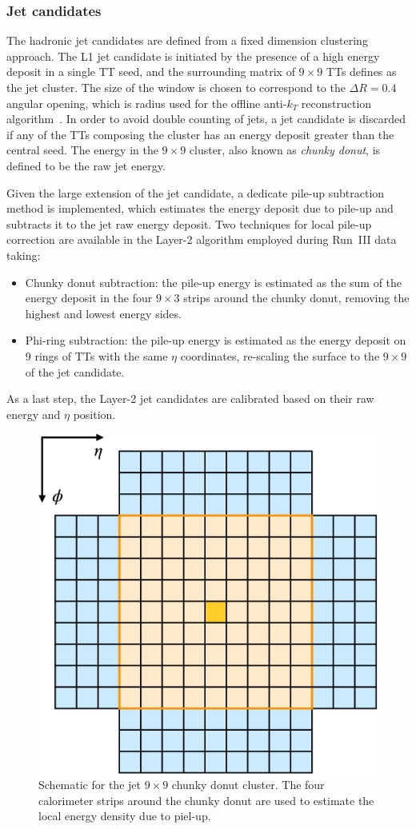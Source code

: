 \subsubsection{Jet candidates}

The hadronic jet candidates are defined from a fixed dimension clustering approach. 
The L1 jet candidate is initiated by the presence of a high energy deposit in a single TT seed, and the surrounding matrix of $9\times9$ TTs defines as the jet cluster. 
The size of the window is chosen to correspond to the $\Delta R = 0.4$ angular opening, which is radius used for the offline anti-$k_T$ reconstruction algorithm~\cite{Zabi_2016}.
In order to avoid double counting of jets, a jet candidate is discarded if any of the TTs composing the cluster has an energy deposit greater than the central seed.
The energy in the $9\times9$ cluster, also known as \textit{chunky donut}, is defined to be the raw jet energy.

Given the large extension of the jet candidate, a dedicate pile-up subtraction method is implemented, which estimates the energy deposit due to pile-up and subtracts it to the jet raw energy deposit.
Two techniques for local pile-up correction are available in the Layer-2 algorithm employed during Run~III data taking:
\begin{itemize}
    \item Chunky donut subtraction: the pile-up energy is estimated as the sum of the energy deposit in the four $9\times3$ strips around the chunky donut, removing the highest and lowest energy sides.
    \item Phi-ring subtraction: the pile-up energy is estimated as the energy deposit on 9 rings of TTs with the same $\eta$ coordinates, re-scaling the surface to the $9\times9$ of the jet candidate.
\end{itemize}

As a last step, the Layer-2 jet candidates are calibrated based on their raw energy and $\eta$ position.

\begin{figure}
    \centering
    \includegraphics[width=0.4\linewidth]{Figures/L1TP/L1JetCluster.pdf}
    \caption{Schematic for the jet $9\times9$ chunky donut cluster. The four calorimeter strips around the chunky donut are used to estimate the local energy density due to piel-up.}
    \label{fig:L1JetCluster}
\end{figure}

